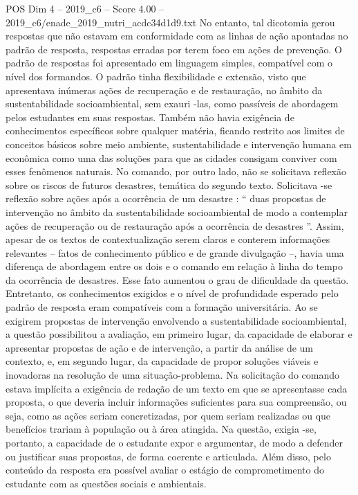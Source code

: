 \begin{textsample}{POS Dim 4 – 2019\_c6 – Score 4.00 – 2019\_c6/enade\_2019\_nutri\_acdc34d1d9.txt}
No entanto, tal dicotomia gerou respostas que não estavam em conformidade com as linhas de ação apontadas no padrão de resposta, respostas erradas por terem foco em ações de prevenção.
O padrão de respostas foi apresentado em linguagem simples, compatível com o nível dos formandos.
O padrão tinha flexibilidade e extensão, visto que apresentava inúmeras ações de recuperação e de restauração, no âmbito da sustentabilidade socioambiental, sem exauri -las, como passíveis de abordagem pelos estudantes em suas respostas.
Também não havia exigência de conhecimentos específicos sobre qualquer matéria, ficando restrito aos limites de conceitos básicos sobre meio ambiente, sustentabilidade e intervenção humana em econômica como uma das soluções para que as cidades consigam conviver com esses fenômenos naturais.
No comando, por outro lado, não se solicitava reflexão sobre os riscos de futuros desastres, temática do segundo texto.
Solicitava -se reflexão sobre ações após a ocorrência de um desastre : “ duas propostas de intervenção no âmbito da sustentabilidade socioambiental de modo a contemplar ações de recuperação ou de restauração após a ocorrência de desastres ”.
Assim, apesar de os textos de contextualização serem claros e conterem informações relevantes – fatos de conhecimento público e de grande divulgação –, havia uma diferença de abordagem entre os dois e o comando em relação à linha do tempo da ocorrência de desastres.
Esse fato aumentou o grau de dificuldade da questão.
Entretanto, os conhecimentos exigidos e o nível de profundidade esperado pelo padrão de resposta eram compatíveis com a formação universitária.
Ao se exigirem propostas de intervenção envolvendo a sustentabilidade socioambiental, a questão possibilitou a avaliação, em primeiro lugar, da capacidade de elaborar e apresentar propostas de ação e de intervenção, a partir da análise de um contexto, e, em segundo lugar, da capacidade de propor soluções viáveis e inovadoras na resolução de uma situação-problema.
Na solicitação do comando estava implícita a exigência de redação de um texto em que se apresentasse cada proposta, o que deveria incluir informações suficientes para sua compreensão, ou seja, como as ações seriam concretizadas, por quem seriam realizadas ou que benefícios trariam à população ou à área atingida.
Na questão, exigia -se, portanto, a capacidade de o estudante expor e argumentar, de modo a defender ou justificar suas propostas, de forma coerente e articulada.
Além disso, pelo conteúdo da resposta era possível avaliar o estágio de comprometimento do estudante com as questões sociais e ambientais.

\end{textsample}
